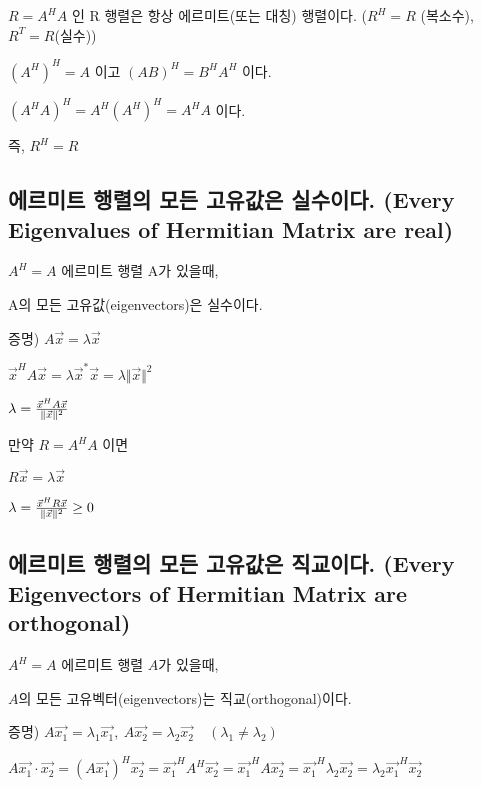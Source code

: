 \begin{theorem}

$R=A^HA$ 인 R 행렬은 항상 에르미트(또는 대칭) 행렬이다. ($R^H=R$ (복소수), $R^T=R$(실수))

\end{theorem}

$(A^H)^H = A$ 이고 $(AB)^H = B^HA^H$ 이다.

$(A^HA)^H=A^H(A^H)^H=A^HA$ 이다. 

즉, $R^H=R$


\newpage
\subsection{에르미트 행렬의 모든 고유값은 실수이다. (Every Eigenvalues of Hermitian Matrix are real)}

\begin{theorem}
$A^H=A$ 에르미트 행렬 A가 있을때,

A의 모든 고유값(eigenvectors)은 실수이다.
\end{theorem}

증명) $A\vec{x} = \lambda\vec{x}$

$\vec{x}^HA\vec{x} = \lambda\vec{x}^{\ast}\vec{x} = \lambda\Vert\vec{x}\Vert^2$

$\lambda = {\vec{x}^HA\vec{x} \over \Vert\vec{x}\Vert^2}$

만약 $R=A^HA$ 이면

$R\vec{x} = \lambda\vec{x} $

$\lambda ={\vec{x}^HR\vec{x} \over \Vert\vec{x}\Vert^2} \ge 0$




\newpage
\subsection{에르미트 행렬의 모든 고유값은 직교이다. (Every Eigenvectors of Hermitian Matrix are orthogonal)}

\begin{theorem}
$A^H=A$ 에르미트 행렬 $A$가 있을때,

$A$의 모든 고유벡터(eigenvectors)는 직교(orthogonal)이다.
\end{theorem}

증명) $A\vec{x_1}=\lambda_1\vec{x_1},\  A\vec{x_2}=\lambda_2\vec{x_2} \quad (\lambda_1 \ne \lambda_2)$

$A\vec{x_1}\cdot\vec{x_2}=(A\vec{x_1})^H\vec{x_2}=\vec{x_1}^HA^H\vec{x_2}=\vec{x_1}^HA\vec{x_2}=\vec{x_1}^H\lambda_2\vec{x_2}=\lambda_2\vec{x_1}^H\vec{x_2}$

